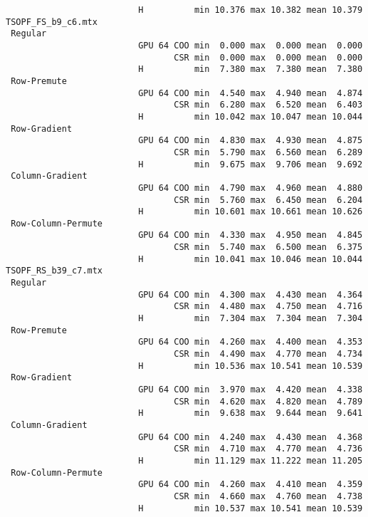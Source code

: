 {\begin{verbatim}
                          H          min 10.376 max 10.382 mean 10.379
TSOPF_FS_b9_c6.mtx
 Regular
                          GPU 64 COO min  0.000 max  0.000 mean  0.000
                                 CSR min  0.000 max  0.000 mean  0.000
                          H          min  7.380 max  7.380 mean  7.380
 Row-Premute
                          GPU 64 COO min  4.540 max  4.940 mean  4.874
                                 CSR min  6.280 max  6.520 mean  6.403
                          H          min 10.042 max 10.047 mean 10.044
 Row-Gradient
                          GPU 64 COO min  4.830 max  4.930 mean  4.875
                                 CSR min  5.790 max  6.560 mean  6.289
                          H          min  9.675 max  9.706 mean  9.692
 Column-Gradient
                          GPU 64 COO min  4.790 max  4.960 mean  4.880
                                 CSR min  5.760 max  6.450 mean  6.204
                          H          min 10.601 max 10.661 mean 10.626
 Row-Column-Permute
                          GPU 64 COO min  4.330 max  4.950 mean  4.845
                                 CSR min  5.740 max  6.500 mean  6.375
                          H          min 10.041 max 10.046 mean 10.044
TSOPF_RS_b39_c7.mtx
 Regular
                          GPU 64 COO min  4.300 max  4.430 mean  4.364
                                 CSR min  4.480 max  4.750 mean  4.716
                          H          min  7.304 max  7.304 mean  7.304
 Row-Premute
                          GPU 64 COO min  4.260 max  4.400 mean  4.353
                                 CSR min  4.490 max  4.770 mean  4.734
                          H          min 10.536 max 10.541 mean 10.539
 Row-Gradient
                          GPU 64 COO min  3.970 max  4.420 mean  4.338
                                 CSR min  4.620 max  4.820 mean  4.789
                          H          min  9.638 max  9.644 mean  9.641
 Column-Gradient
                          GPU 64 COO min  4.240 max  4.430 mean  4.368
                                 CSR min  4.710 max  4.770 mean  4.736
                          H          min 11.129 max 11.222 mean 11.205
 Row-Column-Permute
                          GPU 64 COO min  4.260 max  4.410 mean  4.359
                                 CSR min  4.660 max  4.760 mean  4.738
                          H          min 10.537 max 10.541 mean 10.539
\end{verbatim}
}
